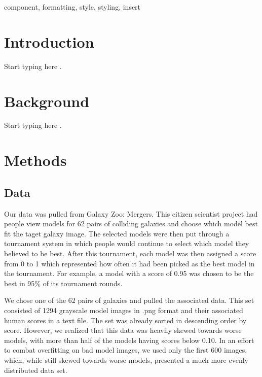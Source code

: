 \documentclass[conference]{IEEEtran}
\begin{document}
\begin{abstract}
This document is a model and instructions for \LaTeX.
This and the IEEEtran.cls file define the components of your paper [title, text, heads, etc.]. *CRITICAL: Do Not Use Symbols, Special Characters, Footnotes, 
or Math in Paper Title or Abstract.
\end{abstract}



\begin{IEEEkeywords}
component, formatting, style, styling, insert
\end{IEEEkeywords}

\section{Introduction}

Start typing here \cite{b1}.

\section{Background}

Start typing here \cite{b2}.

\section{Methods}

\subsection{Data}

Our data was pulled from Galaxy Zoo: Mergers. This citizen scientist project had people view models for 62 pairs of colliding galaxies and choose which model best fit the taget galaxy image. The selected models were then put through a tournament system in which people would continue to select which model they believed to be best. After this tournament, each model was then assigned a score from 0 to 1 which represented how often it had been picked as the best model in the tournament. For example, a model with a score of 0.95 was chosen to be the best in 95\% of its tournament rounds.

We chose one of the 62 pairs of galaxies and pulled the associated data. This set consisted of 1294 grayscale model images in .png format and their associated human scores in a text file. The set was already sorted in descending order by score. However, we realized that this data was heavily skewed towards worse models, with more than half of the models having scores below 0.10. In an effort to combat overfitting on bad model images, we used only the first 600 images, which, while still skewed towards worse models, presented a much more evenly distributed data set.
\end{document}
